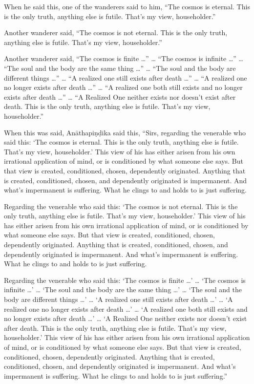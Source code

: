 \documentclass[12pt,openany]{book}%
\begin{document}
When he said this, one of the wanderers said to him, “The cosmos is eternal. This is the only truth, anything else is futile. That’s my view, householder.” 

Another wanderer said, “The cosmos is not eternal. This is the only truth, anything else is futile. That’s my view, householder.” 

Another wanderer said, “The cosmos is finite …” … “The cosmos is infinite …” … “The soul and the body are the same thing …” … “The soul and the body are different things …” … “A realized one still exists after death …” … “A realized one no longer exists after death …” … “A realized one both still exists and no longer exists after death …” … “A Realized One neither exists nor doesn’t exist after death. This is the only truth, anything else is futile. That’s my view, householder.” 

When this was said, \textsanskrit{Anāthapiṇḍika} said this, “Sirs, regarding the venerable who said this: ‘The cosmos is eternal. This is the only truth, anything else is futile. That’s my view, householder.’ This view of his has either arisen from his own irrational application of mind, or is conditioned by what someone else says. But that view is created, conditioned, chosen, dependently originated. Anything that is created, conditioned, chosen, and dependently originated is impermanent. And what’s impermanent is suffering. What he clings to and holds to is just suffering. 

Regarding the venerable who said this: ‘The cosmos is not eternal. This is the only truth, anything else is futile. That’s my view, householder.’ This view of his has either arisen from his own irrational application of mind, or is conditioned by what someone else says. But that view is created, conditioned, chosen, dependently originated. Anything that is created, conditioned, chosen, and dependently originated is impermanent. And what’s impermanent is suffering. What he clings to and holds to is just suffering. 

Regarding the venerable who said this: ‘The cosmos is finite …’ … ‘The cosmos is infinite …’ … ‘The soul and the body are the same thing …’ … ‘The soul and the body are different things …’ … ‘A realized one still exists after death …’ … ‘A realized one no longer exists after death …’ … ‘A realized one both still exists and no longer exists after death …’ … ‘A Realized One neither exists nor doesn’t exist after death. This is the only truth, anything else is futile. That’s my view, householder.’ This view of his has either arisen from his own irrational application of mind, or is conditioned by what someone else says. But that view is created, conditioned, chosen, dependently originated. Anything that is created, conditioned, chosen, and dependently originated is impermanent. And what’s impermanent is suffering. What he clings to and holds to is just suffering.” 
\end{document}
